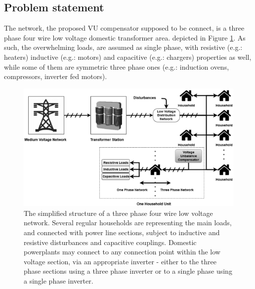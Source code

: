 \subsection{Problem statement}\label{VUB:sec:Statement}

    The network, the proposed VU compensator supposed to be connect, is a three phase four wire low voltage domestic transformer area. depicted in Figure \ref{fig:network}. As such, the overwhelming loads, are assumed as single phase, with resistive (e.g.: heaters) inductive (e.g.: motors) and capacitive (e.g.: chargers) properties as well, while some of them are symmetric three phase ones (e.g.: induction ovens, compressors, inverter fed motors).

    \begin{figure}[!ht]
    \centering
    \includegraphics[width=\textwidth]{Unblance_EPS_Pics/network_gray.eps}
    \caption{The simplified structure of a three phase four wire low voltage network. Several regular households are representing the main loads, and connected with power line sections, subject to inductive and resistive disturbances and capacitive couplings. Domestic powerplants may connect to any connection point within the low voltage section, via an appropriate inverter - either to the three phase sections using a three phase inverter or to a single phase using a single phase inverter.}
    \label{fig:network}
    \end{figure}

